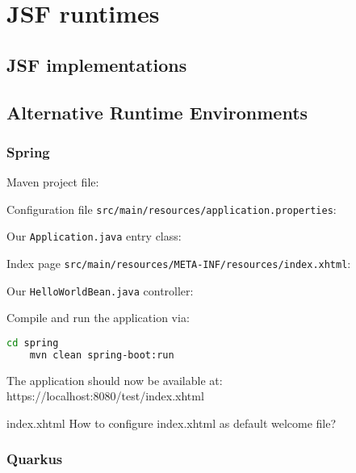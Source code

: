 %

\chapter{JSF runtimes}

\section{JSF implementations}

\section{Alternative Runtime Environments}

\subsection{Spring}

Maven project file:


Configuration file \texttt{src/main/resources/application.properties}:


Our \texttt{Application.java} entry class:


Index page \texttt{src/main/resources/META-INF/resources/index.xhtml}:


Our \texttt{HelloWorldBean.java} controller:


Compile and run the application via:
\begin{lstlisting}[language=bash]
	cd spring
	mvn clean spring-boot:run
\end{lstlisting}
The application should now be available at:
https://localhost:8080/test/index.xhtml

\begin{TODO}{index.xhtml}
	How to configure index.xhtml as default welcome file?
\end{TODO}


\subsection{Quarkus}

